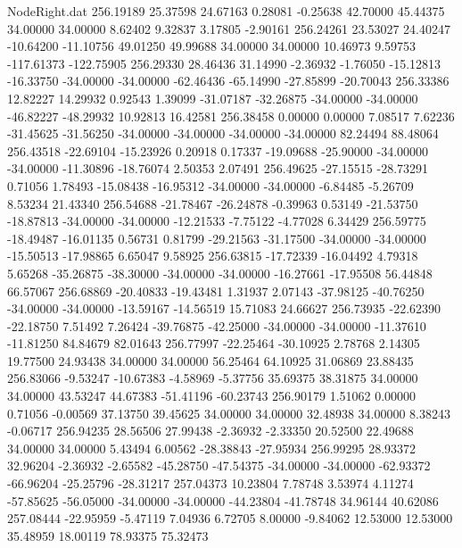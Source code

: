 \begin{filecontents}{NodeRight.dat}
 256.19189   25.37598   24.67163     0.28081   -0.25638   42.70000   45.44375   34.00000   34.00000    8.62402    9.32837    3.17805   -2.90161
 256.24261   23.53027   24.40247   -10.64200  -11.10756   49.01250   49.99688   34.00000   34.00000   10.46973    9.59753 -117.61373 -122.75905
 256.29330   28.46436   31.14990    -2.36932   -1.76050  -15.12813  -16.33750  -34.00000  -34.00000  -62.46436  -65.14990  -27.85899  -20.70043
 256.33386   12.82227   14.29932     0.92543    1.39099  -31.07187  -32.26875  -34.00000  -34.00000  -46.82227  -48.29932   10.92813   16.42581
 256.38458    0.00000    0.00000     7.08517    7.62236  -31.45625  -31.56250  -34.00000  -34.00000  -34.00000  -34.00000   82.24494   88.48064
 256.43518  -22.69104  -15.23926     0.20918    0.17337  -19.09688  -25.90000  -34.00000  -34.00000  -11.30896  -18.76074    2.50353    2.07491
 256.49625  -27.15515  -28.73291     0.71056    1.78493  -15.08438  -16.95312  -34.00000  -34.00000   -6.84485   -5.26709    8.53234   21.43340
 256.54688  -21.78467  -26.24878    -0.39963    0.53149  -21.53750  -18.87813  -34.00000  -34.00000  -12.21533   -7.75122   -4.77028    6.34429
 256.59775  -18.49487  -16.01135     0.56731    0.81799  -29.21563  -31.17500  -34.00000  -34.00000  -15.50513  -17.98865    6.65047    9.58925
 256.63815  -17.72339  -16.04492     4.79318    5.65268  -35.26875  -38.30000  -34.00000  -34.00000  -16.27661  -17.95508   56.44848   66.57067
 256.68869  -20.40833  -19.43481     1.31937    2.07143  -37.98125  -40.76250  -34.00000  -34.00000  -13.59167  -14.56519   15.71083   24.66627
 256.73935  -22.62390  -22.18750     7.51492    7.26424  -39.76875  -42.25000  -34.00000  -34.00000  -11.37610  -11.81250   84.84679   82.01643
 256.77997  -22.25464  -30.10925     2.78768    2.14305   19.77500   24.93438   34.00000   34.00000   56.25464   64.10925   31.06869   23.88435
 256.83066   -9.53247  -10.67383    -4.58969   -5.37756   35.69375   38.31875   34.00000   34.00000   43.53247   44.67383  -51.41196  -60.23743
 256.90179    1.51062    0.00000     0.71056   -0.00569   37.13750   39.45625   34.00000   34.00000   32.48938   34.00000    8.38243   -0.06717
 256.94235   28.56506   27.99438    -2.36932   -2.33350   20.52500   22.49688   34.00000   34.00000    5.43494    6.00562  -28.38843  -27.95934
 256.99295   28.93372   32.96204    -2.36932   -2.65582  -45.28750  -47.54375  -34.00000  -34.00000  -62.93372  -66.96204  -25.25796  -28.31217
 257.04373   10.23804    7.78748     3.53974    4.11274  -57.85625  -56.05000  -34.00000  -34.00000  -44.23804  -41.78748   34.96144   40.62086
 257.08444  -22.95959   -5.47119     7.04936    6.72705    8.00000   -9.84062   12.53000   12.53000   35.48959   18.00119   78.93375   75.32473

\end{filecontents}
